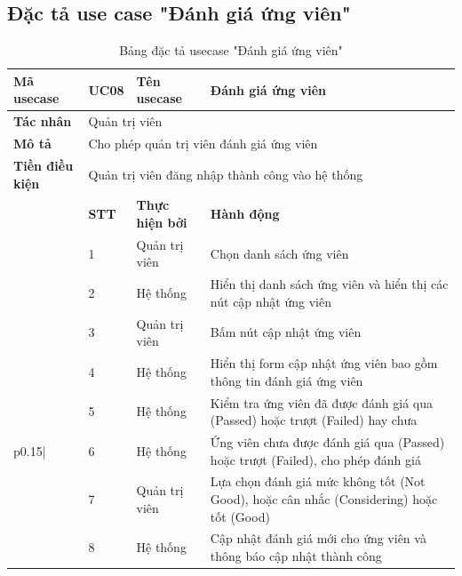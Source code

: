 \documentclass[../DoAn.tex]{subfiles}
\begin{document}
\subsection{Đặc tả use case "Đánh giá ứng viên"}
\begin{longtable}{|p{}|p{}p{}p{}|}
\caption{Bảng đặc tả usecase "Đánh giá ứng viên"}
\hline
\textbf{Mã usecase} & \multicolumn{1}{p{0.1\textwidth}|}{UC08} & \multicolumn{1}{p{0.23\textwidth}|}{\textbf{Tên usecase}} & Đánh giá ứng viên \\ \hline
\textbf{Tác nhân} & \multicolumn{3}{p{0.73\textwidth}|}{Quản trị viên} \\ \hline
\textbf{Mô tả} & \multicolumn{3}{p{0.73\textwidth}|}{Cho phép quản trị viên đánh giá ứng viên} \\ \hline
\textbf{Tiền điều kiện} & \multicolumn{3}{p{0.73\textwidth}|}{Quản trị viên đăng nhập thành công vào hệ thống} \\ \hline
& \multicolumn{1}{l|}{\textbf{STT}} & \multicolumn{1}{l|}{\textbf{Thực hiện bởi}} & \textbf{Hành động} \\ \cline{2-4}
& \multicolumn{1}{l|}{1} & \multicolumn{1}{p{0.23\textwidth}|}{Quản trị viên} & Chọn danh sách ứng viên \\ \cline{2-4}      
& \multicolumn{1}{l|}{2} & \multicolumn{1}{l|}{Hệ thống} & Hiển thị danh sách ứng viên và hiển thị các nút cập nhật ứng viên \\ \cline{2-4}
& \multicolumn{1}{l|}{3} & \multicolumn{1}{l|}{Quản trị viên} & Bấm nút cập nhật ứng viên \\ \cline{2-4}
& \multicolumn{1}{l|}{4} & \multicolumn{1}{l|}{Hệ thống} & Hiển thị form cập nhật ứng viên bao gồm thông tin đánh giá ứng viên \\ \cline{2-4}
& \multicolumn{1}{l|}{5} & \multicolumn{1}{l|}{Hệ thống} & Kiểm tra ứng viên đã được đánh giá qua (Passed) hoặc trượt (Failed) hay chưa \\ \cline{2-4}
\multirow{-3}{\multicolumn{1}{p{0.15\textwidth}|}{\textbf{Luồng sự kiện chính}}} 
& \multicolumn{1}{l|}{6} & \multicolumn{1}{l|}{Hệ thống} & Ứng viên chưa được đánh giá qua (Passed) hoặc trượt (Failed), cho phép đánh giá \\ \cline{2-4}
& \multicolumn{1}{l|}{7} & \multicolumn{1}{l|}{Quản trị viên} & Lựa chọn đánh giá mức không tốt (Not Good), hoặc cân nhắc (Considering) hoặc tốt (Good)\\ \cline{2-4} 
& \multicolumn{1}{l|}{8} & \multicolumn{1}{l|}{Hệ thống} & Cập nhật đánh giá mới cho ứng viên và thông báo cập nhật thành công \\ \cline{2-4} \hline

\end{longtable}
\end{document}
